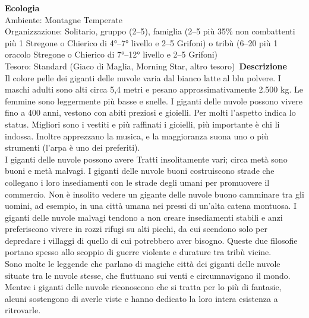 \begin{multicols}{2}
\textbf{Ecologia}\\
Ambiente: Montagne Temperate\\
Organizzazione: Solitario, gruppo (2–5), famiglia (2–5 più 35\% non combattenti più 1 Stregone o Chierico di 4°–7° livello e 2–5 Grifoni) o tribù (6–20 più 1 oracolo Stregone o Chierico di 7°–12° livello e 2–5 Grifoni)\\
Tesoro: Standard (Giaco di Maglia, Morning Star, altro tesoro)\
\textbf{Descrizione}\\
Il colore pelle dei giganti delle nuvole varia dal bianco latte al blu polvere. I maschi adulti sono alti circa 5,4 metri e pesano approssimativamente 2.500 kg. Le femmine sono leggermente più basse e snelle. I giganti delle nuvole possono vivere fino a 400 anni, vestono con abiti preziosi e gioielli. Per molti l'aspetto indica lo status. Migliori sono i vestiti e più raffinati i gioielli, più importante è chi li indossa. Inoltre apprezzano la musica, e la maggioranza suona uno o più strumenti (l'arpa è uno dei preferiti).\\

I giganti delle nuvole possono avere Tratti insolitamente vari; circa metà sono buoni e metà malvagi. I giganti delle nuvole buoni costruiscono strade che collegano i loro insediamenti con le strade degli umani per promuovere il commercio. Non è insolito vedere un gigante delle nuvole buono camminare tra gli uomini, ad esempio, in una città umana nei pressi di un’alta catena montuosa. I giganti delle nuvole malvagi tendono a non creare insediamenti stabili e anzi preferiscono vivere in rozzi rifugi su alti picchi, da cui scendono solo per depredare i villaggi di quello di cui potrebbero aver bisogno. Queste due filosofie portano spesso allo scoppio di guerre violente e durature tra tribù vicine.\\

Sono molte le leggende che parlano di magiche città dei giganti delle nuvole situate tra le nuvole stesse, che fluttuano sui venti e circumnavigano il mondo. Mentre i giganti delle nuvole riconoscono che si tratta per lo più di fantasie, alcuni sostengono di averle viste e hanno dedicato la loro intera esistenza a ritrovarle.\\


\end{multicols}
